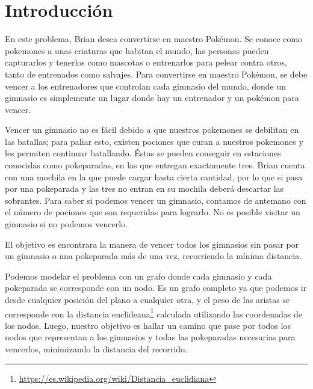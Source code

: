 \section{Introducción}

En este problema, Brian desea convertirse en maestro Pokémon. Se conoce como pokemones a unas criaturas que habitan el mundo, las personas pueden capturarlos y tenerlos como mascotas o entrenarlos para pelear contra otros, tanto de entrenados como salvajes. Para convertirse en maestro Pokémon, se debe vencer a los entrenadores que controlan cada gimnasio del mundo, donde un gimnasio es simplemente un lugar donde hay un entrenador y un pok\'emon para vencer.

Vencer un gimnasio no es fácil debido a que nuestros pokemones se debilitan en las batallas; para paliar esto, existen pociones que curan a nuestros pokemones y les permiten continuar batallando. \'Estas se pueden conseguir en estaciones conocidas como pokeparadas, en las que entregan exactamente tres. Brian cuenta con una mochila en la que puede cargar hasta cierta cantidad, por lo que si pasa por una pokeparada y las tres no entran en su mochila deberá descartar las sobrantes. Para saber si podemos vencer un gimnasio, contamos de antemano con el número de pociones que son requeridas para lograrlo. No es posible visitar un gimnasio si no podemos vencerlo.

El objetivo es encontrara la manera de vencer todos los gimnasios sin pasar por un gimnasio o una pokeparada más de una vez, recorriendo la mínima distancia.

Podemos modelar el problema con un grafo donde cada gimnasio y cada pokeparada se corresponde con un nodo. Es un grafo completo ya que podemos ir desde cualquier posici\'on del plano a cualquier otra, y el peso de las aristas se corresponde con la distancia euclideana\footnote{\url{https://es.wikipedia.org/wiki/Distancia_euclidiana}} calculada utilizando las coordenadas de los nodos. Luego, nuestro objetivo es hallar un camino que pase por todos los nodos que representan a los gimnasios y todas las pokeparadas necesarias para vencerlos, minimizando la distancia del recorrido.

